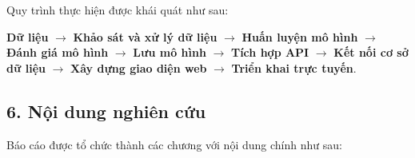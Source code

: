 \documentclass[14pt]{extarticle}
\begin{document}
\noindent Quy trình thực hiện được khái quát như sau:

\begin{center}
	\textbf{Dữ liệu}
	$\rightarrow$
	\textbf{Khảo sát và xử lý dữ liệu}
	$\rightarrow$
	\textbf{Huấn luyện mô hình}
	$\rightarrow$
	\textbf{Đánh giá mô hình}
	$\rightarrow$
	\textbf{Lưu mô hình}
	$\rightarrow$
	\textbf{Tích hợp API}
	$\rightarrow$
	\textbf{Kết nối cơ sở dữ liệu}
	$\rightarrow$
	\textbf{Xây dựng giao diện web}
	$\rightarrow$
	\textbf{Triển khai trực tuyến}.
\end{center}
\subsection*{6. Nội dung nghiên cứu}

\noindent Báo cáo được tổ chức thành các chương với nội dung chính như sau:
\end{document}

